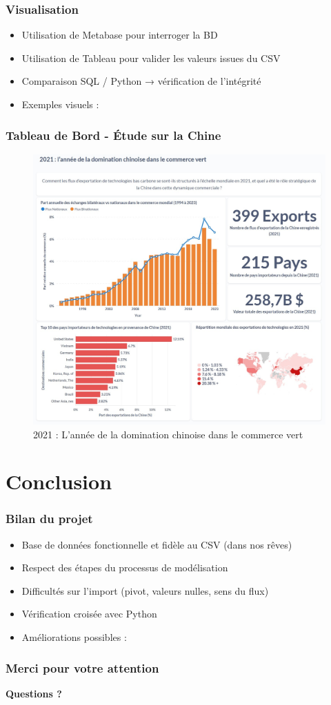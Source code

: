 \documentclass[11pt]{beamer}
\begin{document}
\begin{frame}
  \frametitle{Visualisation}
  \begin{itemize}
    \item Utilisation de Metabase pour interroger la BD
    \item Utilisation de Tableau pour valider les valeurs issues du CSV
    \item Comparaison SQL / Python → vérification de l’intégrité
    \item Exemples visuels :
  \end{itemize}
\end{frame}


\begin{frame}[fragile]
  \frametitle{Tableau de Bord - Étude sur la Chine}
  \begin{figure}
    \centering
    \includegraphics[width=0.625\linewidth]{../script_dataviz/dash-board}
    \caption{2021 : L'année de la domination chinoise dans le commerce vert}
  \end{figure}
\end{frame}

\section{Conclusion}
\begin{frame}
  \frametitle{Bilan du projet}
  \begin{itemize}
    \item Base de données fonctionnelle et fidèle au CSV (dans nos rêves)
    \item Respect des étapes du processus de modélisation
    \item Difficultés sur l’import (pivot, valeurs nulles, sens du flux)
    \item Vérification croisée avec Python
    \item Améliorations possibles :
  \end{itemize}
\end{frame}

\begin{frame}
  \frametitle{Merci pour votre attention}
  \begin{center}
    \huge \textbf{Questions ?}
  \end{center}
\end{frame}
\end{document}

